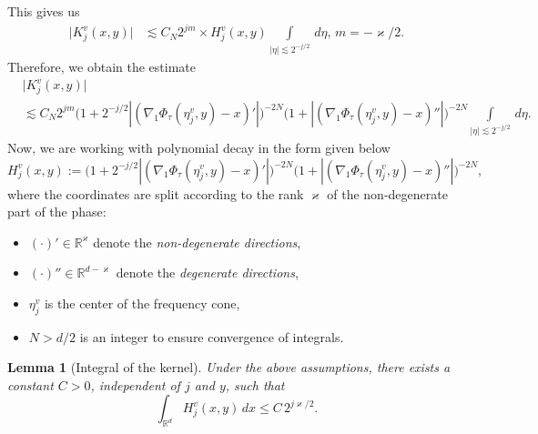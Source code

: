 \documentclass[12pt, reqno]{amsart}
\newtheorem{lemma}[theorem]{Lemma}
\theoremstyle{definition}
\theoremstyle{remark}
\numberwithin{equation}{section}
\begin{document}
This gives us
\begin{align*}
    \big|K_j^v(x,y)\big| &\lesssim   C_N 2^{jm} \times H_j^v(x,y) \int\limits_{|\eta|\lesssim 2^{-j/2}} \,d\eta,\,m=-\varkappa/2.    
\end{align*}
Therefore, we obtain the estimate
\begin{align*}
    &\big|K_j^v(x,y)\big|\\
    &\lesssim  C_N2^{jm}  \big( 1 + 2^{-j/2} | (\nabla_1 \Phi_\tau(\eta_j^v,y) - x)' | \big)^{-2N} 
\big( 1 + | (\nabla_1 \Phi_\tau(\eta_j^v,y) - x)'' | \big)^{-2N} \int\limits_{|\eta|\lesssim 2^{-j/2}}\,d\eta.
\end{align*}
Now, we are working with polynomial decay in the form given below 
\[
H^v_j(x,y) := \big( 1 + 2^{-j/2} | (\nabla_1 \Phi_\tau(\eta_j^v,y) - x)' | \big)^{-2N} 
\big( 1 + | (\nabla_1 \Phi_\tau(\eta_j^v,y) - x)'' | \big)^{-2N},
\]
where the coordinates are split according to the rank \(\varkappa\) of the non-degenerate part of the phase:
\begin{itemize}
    \item $(\cdot)'\in \mathbb{R}^\varkappa$ denote the \emph{non-degenerate directions}, 
    \item $(\cdot)''\in \mathbb{R}^{d-\varkappa}$ denote the \emph{degenerate directions},
    \item $\eta_j^v$ is the center of the frequency cone,
    \item $N>d/2$ is an integer to ensure convergence of integrals.
\end{itemize}

\begin{lemma}[Integral of the kernel]
Under the above assumptions, there exists a constant \(C>0\), independent of \(j\) and \(y\), such that
\[
\int_{\mathbb{R}^d} H^v_j(x,y) \, dx \le C \, 2^{j \varkappa/2}.
\]
\end{lemma}
\end{document}
